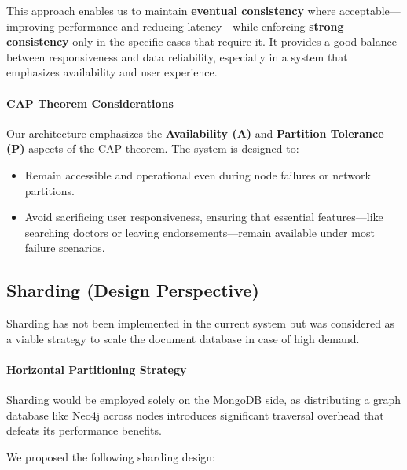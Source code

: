 This approach enables us to maintain \textbf{eventual consistency} where acceptable—improving performance and reducing latency—while enforcing \textbf{strong consistency} only in the specific cases that require it. It provides a good balance between responsiveness and data reliability, especially in a system that emphasizes availability and user experience.

\paragraph{CAP Theorem Considerations}

Our architecture emphasizes the \textbf{Availability (A)} and \textbf{Partition Tolerance (P)} aspects of the CAP theorem. The system is designed to:
\begin{itemize}
  \item Remain accessible and operational even during node failures or network partitions.
  \item Avoid sacrificing user responsiveness, ensuring that essential features—like searching doctors or leaving endorsements—remain available under most failure scenarios.
\end{itemize}

\subsection{Sharding (Design Perspective)}

Sharding has not been implemented in the current system but was considered as a viable strategy to scale the document database in case of high demand.

\paragraph{Horizontal Partitioning Strategy}

Sharding would be employed solely on the MongoDB side, as distributing a graph database like Neo4j across nodes introduces significant traversal overhead that defeats its performance benefits.

We proposed the following sharding design:

